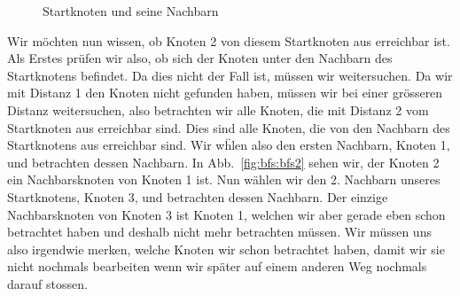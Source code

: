 \begin{figure}[htb]
\begin{center}
\caption{Startknoten und seine Nachbarn}
\label{fig:bfs:bfs1}
\end{center}
\end{figure}


Wir m\"ochten nun wissen, ob Knoten 2 von diesem Startknoten aus erreichbar ist. Als Erstes pr\"ufen wir also, ob sich der Knoten unter den Nachbarn des Startknotens befindet. Da dies nicht der Fall ist, m\"ussen wir weitersuchen. Da wir mit Distanz 1 den Knoten nicht gefunden haben, m\"ussen wir bei einer gr\"osseren Distanz weitersuchen, also betrachten wir alle Knoten, die mit Distanz 2 vom Startknoten aus erreichbar sind. Dies sind alle Knoten, die von den Nachbarn des Startknotens aus erreichbar sind. Wir w\"hlen also den ersten Nachbarn, Knoten 1, und betrachten dessen Nachbarn. In Abb.~\ref{fig:bfs:bfs2} sehen wir, der Knoten 2 ein Nachbarsknoten von Knoten 1 ist. Nun w\"ahlen wir den 2. Nachbarn unseres Startknotens, Knoten 3, und betrachten dessen Nachbarn. Der einzige Nachbarsknoten von Knoten 3 ist Knoten 1, welchen wir aber gerade eben schon betrachtet haben und deshalb nicht mehr betrachten m\"ussen. Wir m\"ussen uns also irgendwie merken, welche Knoten wir schon betrachtet haben, damit wir sie nicht nochmals bearbeiten wenn wir sp\"ater auf einem anderen Weg nochmals darauf stossen. 

